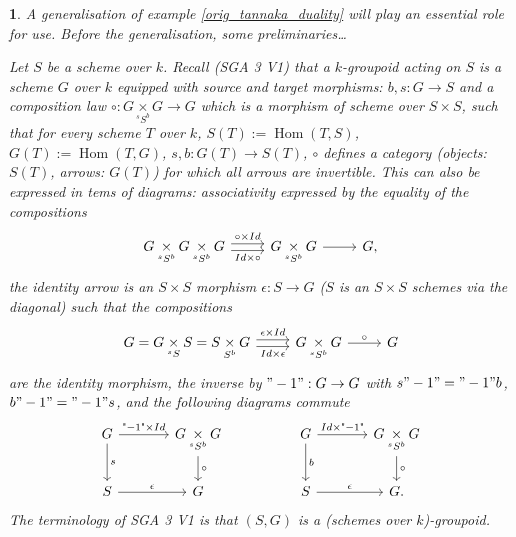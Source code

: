 \documentclass{article}
\newtheorem{env}[term]{}
\DeclareMathOperator{\Hom}{\text{Hom}}
\begin{document}
\begin{env}
  A generalisation of example \ref{orig_tannaka_duality} will play an essential role for use. Before the 
  generalisation, some preliminaries\dots

  Let $S$ be a scheme over $k$. Recall (SGA 3 V1) that a $k$-groupoid acting on $S$ is a scheme $G$ over $k$ equipped
  with source and target morphisms: $b,s : G \rightarrow S$ and a composition law 
  $\circ: G \underset{ ^s S ^b} \times G \rightarrow G$ which is a morphism of scheme over $S \times S$, such that
  for every scheme $T$ over $k$, $S(T) := \Hom (T,S)$, $G(T) := \Hom(T,G)$, $s,b : G(T) \rightarrow S(T)$,
  $\circ$ defines a category (objects: $S(T)$, arrows: $G(T)$) for which all arrows are invertible. This can 
  also be expressed in tems of diagrams: associativity expressed by the equality of the compositions
  $$ \begin{tikzcd}
    G \underset{^s S ^b} \times G \underset{^s S ^b}\times G\arrow[r,"\circ \times Id",shift left]\arrow[r,"Id \times \circ"',shift right] & G \underset{^s S ^b} \times G \arrow [r]& G,
  \end{tikzcd} $$
  the identity arrow is an $S\times S$ morphism $\epsilon: S \rightarrow G$ 
  ($S$ is an $S\times S$ schemes via the diagonal) such that the compositions
  $$ 
  \begin{tikzcd}
    G = G \underset{^s S}\times S = S \underset{S^b}\times G \arrow [r,shift left,"\epsilon \times Id"]\arrow[r,shift right,"Id\times \epsilon"']& G \underset{^s S ^b}\times G \arrow [r,"\circ"]& G
  \end{tikzcd}
  $$
  are the identity morphism, the inverse by $"-1":G \rightarrow G$ with $s "-1" = "-1"b$, $b"-1" = "-1"s$, and 
  the following diagrams commute 
  $$ 
  \begin{tikzcd}[column sep=large]
    G \arrow [r,"\text{"$-1$"} \times Id "]\arrow [d,"s"]& G\underset {^s S ^b}\times G\arrow [d,"\circ"] \\ S \arrow[r,"\epsilon"]& G
  \end{tikzcd}
  \begin{tikzcd}
     & & \\  & & 
  \end{tikzcd}
  \begin{tikzcd}[column sep=large]
    G \arrow [r,"Id \times \text{"$-1$"}"]\arrow [d,"b"]& G\underset {^s S ^b}\times G\arrow [d,"\circ"] \\ S \arrow[r,"\epsilon"]& G.
  \end{tikzcd}
  $$
  The terminology of SGA 3 V1 is that $(S,G)$ is a (schemes over $k$)-groupoid. 


\end{env}
\end{document}

